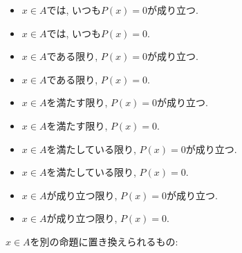 \documentclass[a4paper,12pt,draft]{amsart}
\newcommand{\PPP}[1]{P(#1)=0}
\begin{document}
\begin{itemize}
\item $x\in A$では, いつも$\PPP{x}$が成り立つ.
\item $x\in A$では, いつも$\PPP{x}$.
\item $x\in A$である限り, $\PPP{x}$が成り立つ.
\item $x\in A$である限り, $\PPP{x}$.
\item $x\in A$を満たす限り, $\PPP{x}$が成り立つ.
\item $x\in A$を満たす限り, $\PPP{x}$.
\item $x\in A$を満たしている限り, $\PPP{x}$が成り立つ.
\item $x\in A$を満たしている限り, $\PPP{x}$.
\item $x\in A$が成り立つ限り, $\PPP{x}$が成り立つ.
\item $x\in A$が成り立つ限り, $\PPP{x}$.
\end{itemize}
$x\in A$を別の命題に置き換えられるもの:
\end{document}
